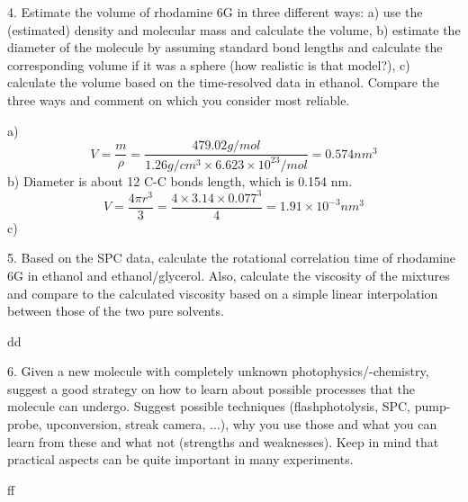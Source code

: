 \documentclass{article}
\begin{document}
4. Estimate the volume of rhodamine 6G in three different ways: a) use the (estimated) density and
molecular mass and calculate the volume, b) estimate the diameter of the molecule by assuming standard
bond lengths and calculate the corresponding volume if it was a sphere (how realistic is that model?), c)
calculate the volume based on the time-resolved data in ethanol.
Compare the three ways and comment on which you consider most reliable. \\ \par 
a) 
\begin{equation*}
V=\frac{m}{\rho}=\frac{479.02 g/mol}{1.26 g/cm^3\times 6.623\times 10^{23}/mol}=0.574 nm^3
\end{equation*}
b) Diameter is about 12 C-C bonds length, which is 0.154 nm.  
\begin{equation*}
V=\frac{4\pi r^3}{3}=\frac{4\times 3.14\times 0.077^3}{4}=1.91\times 10^{-3} nm^3
\end{equation*}
c)  \\ \par 

5. Based on the SPC data, calculate the rotational correlation time of rhodamine 6G in ethanol and
ethanol/glycerol. Also, calculate the viscosity of the mixtures and compare to the calculated viscosity
based on a simple linear interpolation between those of the two pure solvents. \\ \par
dd\\ \par

6.  Given a new molecule with completely unknown photophysics/-chemistry, suggest a good strategy on
how to learn about possible processes that the molecule can undergo. Suggest possible techniques (flashphotolysis,
SPC, pump-probe, upconversion, streak camera, ...), why you use those and what you can
learn from these and what not (strengths and weaknesses). Keep in mind that practical aspects can be
quite important in many experiments. \\ \par
ff\\ \par
\end{document}
